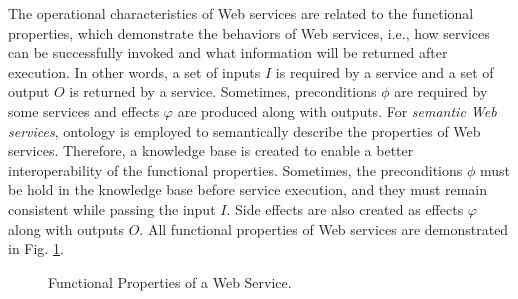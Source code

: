 The operational characteristics of Web services are related to the functional properties, which demonstrate the behaviors of Web services, i.e., how services can be successfully invoked and what information will be returned after execution. In other words, a set of inputs $I$ is required by a service and a set of output $O$ is returned by a service. Sometimes, preconditions $\phi$ are required by some services and effects $\varphi$ are produced along with outputs. For \emph{semantic Web services}, ontology is employed to semantically describe the properties of Web services. Therefore, a knowledge base is created to enable a better interoperability of the functional properties. Sometimes, the preconditions $\phi$ must be hold in the knowledge base before service execution, and they must remain consistent while passing the input $I$. Side effects are also created as effects $\varphi$ along with outputs $O$. All functional properties of Web services are demonstrated in Fig. \ref{fig:ws}.


\begin{figure}
\centerline{
}
\caption{Functional Properties of a Web Service.}
\label{fig:ws}
\end{figure}


